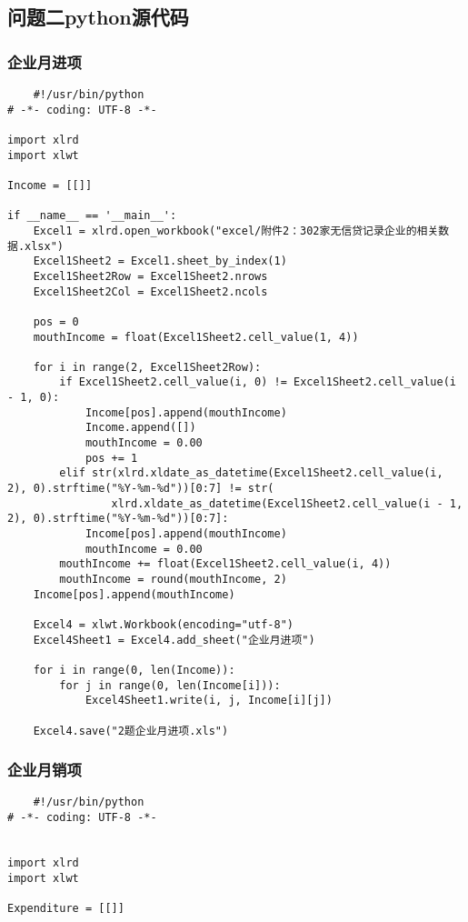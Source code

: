 \documentclass[dvipsnames,withoutpreface,bwprint]{cumcmthesis}
\begin{document}
\begin{appendices}
\subsection{问题二python源代码}
\subsubsection{企业月进项}
\begin{lstlisting}
    #!/usr/bin/python
# -*- coding: UTF-8 -*-

import xlrd
import xlwt

Income = [[]]

if __name__ == '__main__':
    Excel1 = xlrd.open_workbook("excel/附件2：302家无信贷记录企业的相关数据.xlsx")
    Excel1Sheet2 = Excel1.sheet_by_index(1)
    Excel1Sheet2Row = Excel1Sheet2.nrows
    Excel1Sheet2Col = Excel1Sheet2.ncols

    pos = 0
    mouthIncome = float(Excel1Sheet2.cell_value(1, 4))

    for i in range(2, Excel1Sheet2Row):
        if Excel1Sheet2.cell_value(i, 0) != Excel1Sheet2.cell_value(i - 1, 0):
            Income[pos].append(mouthIncome)
            Income.append([])
            mouthIncome = 0.00
            pos += 1
        elif str(xlrd.xldate_as_datetime(Excel1Sheet2.cell_value(i, 2), 0).strftime("%Y-%m-%d"))[0:7] != str(
                xlrd.xldate_as_datetime(Excel1Sheet2.cell_value(i - 1, 2), 0).strftime("%Y-%m-%d"))[0:7]:
            Income[pos].append(mouthIncome)
            mouthIncome = 0.00
        mouthIncome += float(Excel1Sheet2.cell_value(i, 4))
        mouthIncome = round(mouthIncome, 2)
    Income[pos].append(mouthIncome)

    Excel4 = xlwt.Workbook(encoding="utf-8")
    Excel4Sheet1 = Excel4.add_sheet("企业月进项")

    for i in range(0, len(Income)):
        for j in range(0, len(Income[i])):
            Excel4Sheet1.write(i, j, Income[i][j])

    Excel4.save("2题企业月进项.xls")
\end{lstlisting}
\subsubsection{企业月销项}
\begin{lstlisting}
    #!/usr/bin/python
# -*- coding: UTF-8 -*-


import xlrd
import xlwt

Expenditure = [[]]


\end{lstlisting}
\end{appendices}
\end{document}
